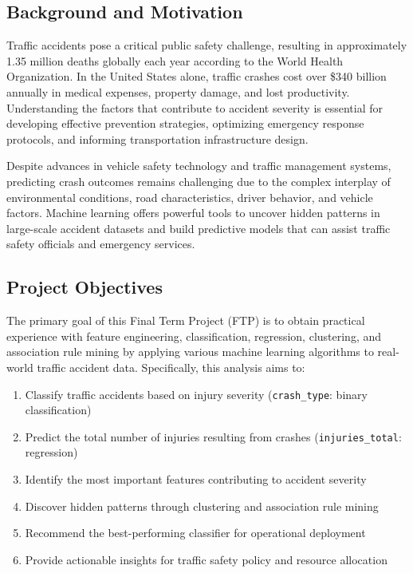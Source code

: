 \documentclass[12pt,man]{apa7}
\begin{document}
\subsection{Background and Motivation}

Traffic accidents pose a critical public safety challenge, resulting in approximately 1.35 million deaths globally each year according to the World Health Organization. In the United States alone, traffic crashes cost over \$340 billion annually in medical expenses, property damage, and lost productivity. Understanding the factors that contribute to accident severity is essential for developing effective prevention strategies, optimizing emergency response protocols, and informing transportation infrastructure design.

Despite advances in vehicle safety technology and traffic management systems, predicting crash outcomes remains challenging due to the complex interplay of environmental conditions, road characteristics, driver behavior, and vehicle factors. Machine learning offers powerful tools to uncover hidden patterns in large-scale accident datasets and build predictive models that can assist traffic safety officials and emergency services.

\subsection{Project Objectives}

The primary goal of this Final Term Project (FTP) is to obtain practical experience with feature engineering, classification, regression, clustering, and association rule mining by applying various machine learning algorithms to real-world traffic accident data. Specifically, this analysis aims to:

\begin{enumerate}
    \item Classify traffic accidents based on injury severity (\texttt{crash\_type}: binary classification)
    \item Predict the total number of injuries resulting from crashes (\texttt{injuries\_total}: regression)
    \item Identify the most important features contributing to accident severity
    \item Discover hidden patterns through clustering and association rule mining
    \item Recommend the best-performing classifier for operational deployment
    \item Provide actionable insights for traffic safety policy and resource allocation
\end{enumerate}
\end{document}
